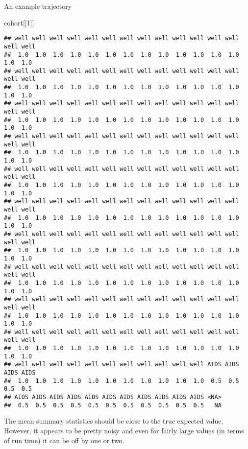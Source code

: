 \documentclass[]{book}
\newenvironment{Shaded}{\begin{snugshade}}{\end{snugshade}}
\newcommand{\DecValTok}[1]{\textcolor[rgb]{0.00,0.00,0.81}{#1}}
\newcommand{\NormalTok}[1]{#1}
\begin{document}
An example trajectory

\begin{Shaded}
\begin{Highlighting}[]
\NormalTok{cohort[[}\DecValTok{1}\NormalTok{]]}
\end{Highlighting}
\end{Shaded}

\begin{verbatim}
## well well well well well well well well well well well well well well well 
##  1.0  1.0  1.0  1.0  1.0  1.0  1.0  1.0  1.0  1.0  1.0  1.0  1.0  1.0  1.0 
## well well well well well well well well well well well well well well well 
##  1.0  1.0  1.0  1.0  1.0  1.0  1.0  1.0  1.0  1.0  1.0  1.0  1.0  1.0  1.0 
## well well well well well well well well well well well well well well well 
##  1.0  1.0  1.0  1.0  1.0  1.0  1.0  1.0  1.0  1.0  1.0  1.0  1.0  1.0  1.0 
## well well well well well well well well well well well well well well well 
##  1.0  1.0  1.0  1.0  1.0  1.0  1.0  1.0  1.0  1.0  1.0  1.0  1.0  1.0  1.0 
## well well well well well well well well well well well well well well well 
##  1.0  1.0  1.0  1.0  1.0  1.0  1.0  1.0  1.0  1.0  1.0  1.0  1.0  1.0  1.0 
## well well well well well well well well well well well well well well well 
##  1.0  1.0  1.0  1.0  1.0  1.0  1.0  1.0  1.0  1.0  1.0  1.0  1.0  1.0  1.0 
## well well well well well well well well well well well well well well well 
##  1.0  1.0  1.0  1.0  1.0  1.0  1.0  1.0  1.0  1.0  1.0  1.0  1.0  1.0  1.0 
## well well well well well well well well well well well well well well well 
##  1.0  1.0  1.0  1.0  1.0  1.0  1.0  1.0  1.0  1.0  1.0  1.0  1.0  1.0  1.0 
## well well well well well well well well well well well well well well well 
##  1.0  1.0  1.0  1.0  1.0  1.0  1.0  1.0  1.0  1.0  1.0  1.0  1.0  1.0  1.0 
## well well well well well well well well well well well well well well well 
##  1.0  1.0  1.0  1.0  1.0  1.0  1.0  1.0  1.0  1.0  1.0  1.0  1.0  1.0  1.0 
## well well well well well well well well well well well AIDS AIDS AIDS AIDS 
##  1.0  1.0  1.0  1.0  1.0  1.0  1.0  1.0  1.0  1.0  1.0  0.5  0.5  0.5  0.5 
## AIDS AIDS AIDS AIDS AIDS AIDS AIDS AIDS AIDS AIDS AIDS <NA> 
##  0.5  0.5  0.5  0.5  0.5  0.5  0.5  0.5  0.5  0.5  0.5   NA
\end{verbatim}

The mean summary statistics should be close to the true expected value.
However, it appears to be pretty noisy and even for fairly large values (in terms of run time) it can be off by one or two.
\end{document}
